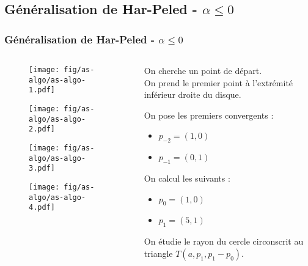 \documentclass{beamer}
\begin{document}
\subsection{Généralisation de Har-Peled - $\alpha \leq 0$}
\begin{frame}
\frametitle{Généralisation de Har-Peled - $\alpha \leq 0$}
 
  \begin{columns}[t]
  \begin{column}{7cm}
      {
        \begin{figure}[h!]
          \centering
          \texttt{[image: fig/as-algo/as-algo-1.pdf]}
      \end{figure}
      }
      {
        \begin{figure}[h!]
          \centering
          \texttt{[image: fig/as-algo/as-algo-2.pdf]}
      \end{figure}
      }
      {
        \begin{figure}[h!]
          \centering
          \texttt{[image: fig/as-algo/as-algo-3.pdf]}
      \end{figure}
      }
      {
        \begin{figure}[h!]
          \centering
          \texttt{[image: fig/as-algo/as-algo-4.pdf]}
      \end{figure}
      }
    \end{column}
    \begin{column}{3cm}
      \begin{block}{}
        {
          On cherche un point de départ.
          \\ On prend le premier point à l'extrémité inférieur droite du disque.
        }
        {
          On pose les premiers convergents :\\
          \begin{itemize}
            \item $p_{-2} = (1, 0)$
            \item $p_{-1} = (0, 1)$
          \end{itemize}            
        }
        {
          On calcul les suivants :\\
          \begin{itemize}
            \item $p_{0} = (1, 0)$
            \item $p_{1} = (5, 1)$
          \end{itemize}            
        }
        {
          On étudie le rayon du cercle circonscrit au triangle $T(a, p_{1}, p_{1}-p_{0})$.
        }
      \end{block}     
    \end{column}
  \end{columns}

\end{frame}
\end{document}

